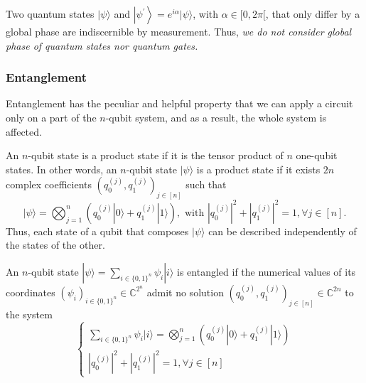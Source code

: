\begin{remark}
    Two quantum states $|\psi\rangle$ and $\left|\psi^{\prime}\right\rangle=e^{i \alpha}|\psi\rangle$, with $\alpha \in[0,2 \pi[$, that only differ by a global phase are indiscernible by measurement. Thus, \textit{we do not consider global phase of quantum states nor quantum gates.} %
\end{remark}

\subsubsection{Entanglement}

Entanglement has the peculiar and helpful property that we can apply a circuit only on a part of the $n$-qubit system, and as a result, the whole system is affected.

\begin{definition}
    An $n$-qubit state is a product state if it is the tensor product of $n$ one-qubit states. In other words, an $n$-qubit state $|\psi\rangle$ is a product state if it exists $2 n$ complex coefficients $\left(q_{0}^{(j)}, q_{1}^{(j)}\right)_{j \in[n]}$ such that
\begin{equation}
    |\psi\rangle=\bigotimes_{j=1}^{n}\left(q_{0}^{(j)}|0\rangle+q_{1}^{(j)}|1\rangle\right), \text { with }\left|q_{0}^{(j)}\right|^{2}+\left|q_{1}^{(j)}\right|^{2}=1, \forall j \in[n].
\end{equation}
Thus, each state of a qubit that composes $|\psi\rangle$ can be described independently of the states of the other.
\end{definition}

\begin{definition}
    An $n$-qubit state $|\psi\rangle=\sum_{i \in\{0,1\}^{n}} \psi_{i}|i\rangle$ is entangled if the numerical values of its coordinates $\left(\psi_{i}\right)_{i \in\{0,1\}^{n}} \in \mathbb{C}^{2^{n}}$ admit no solution $\left(q_{0}^{(j)}, q_{1}^{(j)}\right)_{j \in[n]} \in \mathbb{C}^{2 n}$ to the system
\begin{equation}
    \left\{\begin{array}{l}
\sum_{i \in\{0,1\}^{n}} \psi_{i}|i\rangle=\bigotimes_{j=1}^{n}\left(q_{0}^{(j)}|0\rangle+q_{1}^{(j)}|1\rangle\right) \\
\left|q_{0}^{(j)}\right|^{2}+\left|q_{1}^{(j)}\right|^{2}=1, \forall j \in [n]
\end{array}\right.
\end{equation}

\end{definition}

